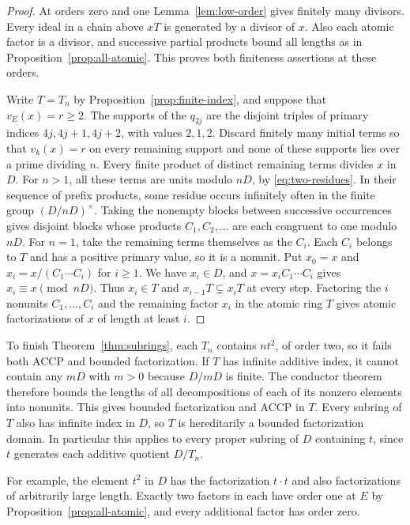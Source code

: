 \begin{proof}
    At orders zero and one Lemma~\ref{lem:low-order} gives finitely many divisors.
    Every ideal in a chain above $xT$ is generated by a divisor of $x$.
    Also each atomic factor is a divisor, and successive partial products bound all lengths as in Proposition~\ref{prop:all-atomic}.
    This proves both finiteness assertions at these orders.

    Write $T = T_n$ by Proposition~\ref{prop:finite-index}, and suppose that $v_E(x) = r \ge 2$.
    The supports of the $q_{2j}$ are the disjoint triples of primary indices $4j, 4j + 1, 4j + 2$, with values $2, 1, 2$.
    Discard finitely many initial terms so that $v_k(x) = r$ on every remaining support and none of these supports lies over a prime dividing $n$.
    Every finite product of distinct remaining terms divides $x$ in $D$.
    For $n > 1$, all these terms are units modulo $nD$, by \eqref{eq:two-residues}.
    In their sequence of prefix products, some residue occurs infinitely often in the finite group $(D/nD)^{\times}$.
    Taking the nonempty blocks between successive occurrences gives disjoint blocks whose products $C_1, C_2, \ldots$ are each congruent to one modulo $nD$.
    For $n = 1$, take the remaining terms themselves as the $C_i$.
    Each $C_i$ belongs to $T$ and has a positive primary value, so it is a nonunit.
    Put $x_0 = x$ and $x_i = x/(C_1 \cdots C_i)$ for $i \ge 1$.
    We have $x_i \in D$, and $x = x_i C_1 \cdots C_i$ gives $x_i \equiv x \pmod{nD}$.
    Thus $x_i \in T$ and $x_{i - 1}T \subsetneq x_iT$ at every step.
    Factoring the $i$ nonunits $C_1, \ldots, C_i$ and the remaining factor $x_i$ in the atomic ring $T$ gives atomic factorizations of $x$ of length at least $i$.
\end{proof}

To finish Theorem~\ref{thm:subrings}, each $T_n$ contains $nt^2$, of order two, so it fails both ACCP and bounded factorization.
If $T$ has infinite additive index, it cannot contain any $mD$ with $m > 0$ because $D/mD$ is finite.
The conductor theorem therefore bounds the lengths of all decompositions of each of its nonzero elements into nonunits.
This gives bounded factorization and ACCP in $T$.
Every subring of $T$ also has infinite index in $D$, so $T$ is hereditarily a bounded factorization domain.
In particular this applies to every proper subring of $D$ containing $t$, since $t$ generates each additive quotient $D/T_n$.

For example, the element $t^2$ in $D$ has the factorization $t \cdot t$ and also factorizations of arbitrarily large length.
Exactly two factors in each have order one at $E$ by Proposition~\ref{prop:all-atomic}, and every additional factor has order zero.
